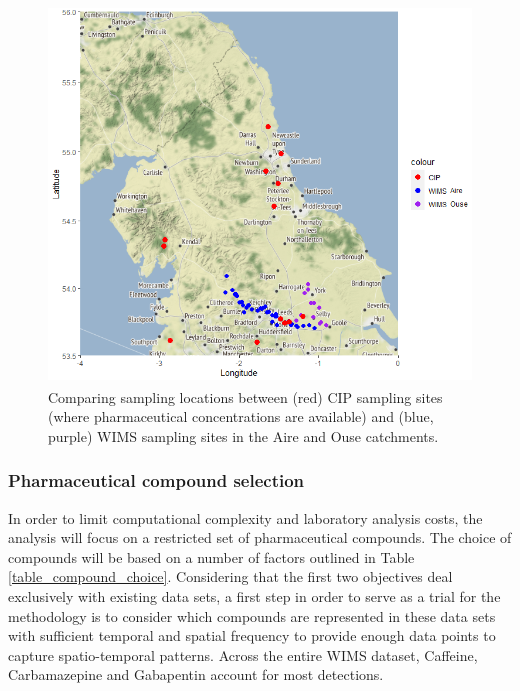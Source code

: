 \documentclass{article}
\begin{document}
\begin{figure}[t]
    \centering
    \includegraphics[height=10cm]{fig_catchments_wims_cip.png}
    \caption{Comparing sampling locations between (red) CIP sampling sites (where pharmaceutical concentrations are available) and (blue, purple) WIMS sampling sites in the Aire and Ouse catchments.}
    \label{fig_catchment_map}
\end{figure}

\subsubsection{Pharmaceutical compound selection}
In order to limit computational complexity and laboratory analysis costs, the analysis will focus on a restricted set of pharmaceutical compounds. The choice of compounds will be based on a number of factors outlined in Table \ref{table_compound_choice}. Considering that the first two objectives deal exclusively with existing data sets, a first step in order to serve as a trial for the methodology is to consider which compounds are represented in these data sets with sufficient temporal and spatial frequency to provide enough data points to capture spatio-temporal patterns. Across the entire WIMS dataset, Caffeine, Carbamazepine and Gabapentin account for most detections.
\end{document}
